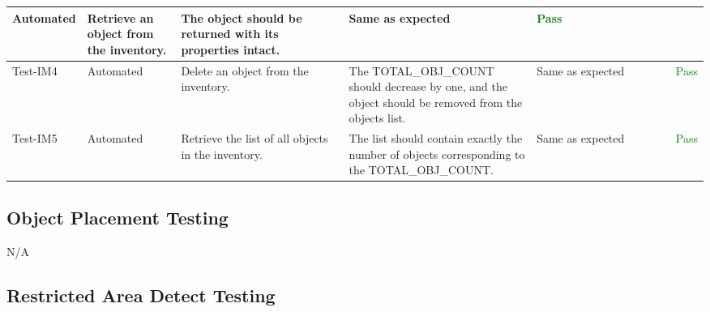 \documentclass[12pt, titlepage]{article}
\begin{document}
\begin{table}[H]
{\begin{tabular}{|l|p{0.15\linewidth}|p{0.3\linewidth}|p{0.3\linewidth}|p{0.3\linewidth}|p{0.1\linewidth}|}
      Automated                                                                                             &
      Retrieve an object from the inventory.                                                                &
      The object should be returned with its properties intact.                                             &
      Same as expected                                                                                      &
      \textcolor{Green}{Pass}                                                                                                   \\
      \hline
      Test-IM4                                                                                              &
      Automated                                                                                             &
      Delete an object from the inventory.                                                                  &
      The TOTAL\_OBJ\_COUNT should decrease by one, and the object should be removed from the objects list. &
      Same as expected                                                                                      &
      \textcolor{Green}{Pass}                                                                                                   \\
      \hline
      Test-IM5                                                                                              &
      Automated                                                                                             &
      Retrieve the list of all objects in the inventory.                                                    &
      The list should contain exactly the number of objects corresponding to the TOTAL\_OBJ\_COUNT.         &
      Same as expected                                                                                      &
      \textcolor{Green}{Pass}                                                                                                   \\
      \hline
    \end{tabular}}
  \label{table:Inventory_Module_Unit_Tests}
\end{table}

\subsection{Object Placement Testing}
N/A

\subsection{Restricted Area Detect Testing}
\end{document}
